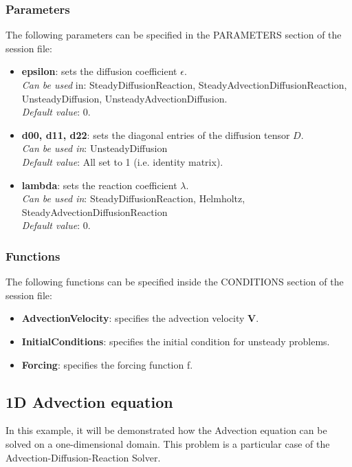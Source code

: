 \subsubsection{Parameters}

The following parameters can be specified in the PARAMETERS section of the session file:
\begin{itemize}
\item \textbf{epsilon}: sets the diffusion coefficient $\epsilon$.\\ 
\textit{Can be used} in: SteadyDiffusionReaction, SteadyAdvectionDiffusionReaction, UnsteadyDiffusion, UnsteadyAdvectionDiffusion. \\
\textit{Default value}: 0.
\item  \textbf{d00, d11, d22}: sets the diagonal entries of the diffusion tensor $D$. \\
\textit{Can be used in}: UnsteadyDiffusion \\
\textit{Default value}: All set to 1 (i.e. identity matrix). 
\item  \textbf{lambda}: sets the reaction coefficient  $\lambda$. \\
\textit{Can be used in}: SteadyDiffusionReaction, Helmholtz, SteadyAdvectionDiffusionReaction\\
\textit{Default value}: 0.
\end{itemize}

\subsubsection{Functions}

The following functions can be specified inside the CONDITIONS section of the session file:

\begin{itemize}
\item \textbf{AdvectionVelocity}: specifies the advection velocity $\mathbf{V}$.
\item \textbf{InitialConditions}: specifies the initial condition for unsteady problems.
\item \textbf{Forcing}: specifies the forcing function f.
\end{itemize}

\subsection{1D Advection equation}

In this example, it will be demonstrated how the Advection equation can be solved on a one-dimensional domain.
This problem is a particular case of the Advection-Diffusion-Reaction Solver. \\


